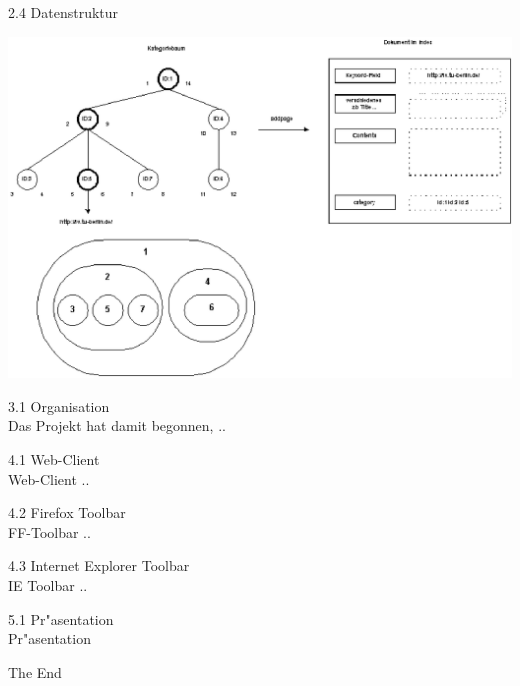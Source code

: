 \documentclass[landscape]{slides}
\begin{document}
%	
\begin{slide}{2.4 Datenstruktur}\\
\begin{center}
\includegraphics[width=17cm]{bilder/katstruktur.eps}
\end{center}
\end{slide}
%
%
%
%
\begin{slide}{3.1 Organisation}\\
Das Projekt hat damit begonnen, ..
\end{slide}
%
%
%
\begin{slide}{4.1 Web-Client}\\

Web-Client ..

\end{slide}
%
\begin{slide}{4.2 Firefox Toolbar}\\
FF-Toolbar ..
\end{slide}
%
%
%
\begin{slide}{4.3 Internet Explorer Toolbar}\\
IE Toolbar ..
\end{slide}
%
\begin{slide}{5.1 Pr"asentation}\\
Pr"asentation
\end{slide}
%
%
%
%
\begin{slide}{}
The End
\end{slide}
\end{document}
